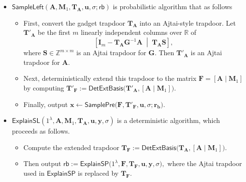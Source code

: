 \begin{itemize}[leftmargin=*]

    \item 
    $\mathsf{SampleLeft}(\mathbf{A},\mathbf{M}_1,\mathbf{T}_{\mathbf A},
    \mathbf{u},\sigma;\mathsf{rb})$ is probabilistic algorithm that  as follows

    \begin{itemize}
        \item First, convert the gadget trapdoor $\mathbf{T}_{\mathbf A}$ into an
        Ajtai-style trapdoor. Let $\mathbf{T}'_{\mathbf A}$ be the first $m$
        linearly independent columns over $\mathbb{R}$ of
        \[
            \left[
                \mathbf{I}_m
                -
                \mathbf{T}_{\mathbf A}\mathbf{G}^{-1}\mathbf{A}
                \;\middle|\;
                \mathbf{T}_{\mathbf A}\mathbf{S}
            \right],
        \]
        where $\mathbf{S}\in\mathbb{Z}^{m\times m}$ is an Ajtai trapdoor for
        $\mathbf{G}$. Then $\mathbf{T}'_{\mathbf A}$ is an Ajtai trapdoor for
        $\mathbf{A}$.

        \item Next, deterministically extend this trapdoor to the matrix
        $\mathbf{F}=[\mathbf{A}\mid\mathbf{M}_1]$ by computing
        $
            \mathbf{T}'_{\mathbf F}
            :=
            \mathsf{DetExtBasis}
            \bigl(
                \mathbf{T}'_{\mathbf A},
                [\mathbf{A}\mid\mathbf{M}_1]
            \bigr).
        $

        \item Finally, output
        $
            \mathbf{x}
            \leftarrow
            \mathsf{SamplePre}
            \bigl(
                \mathbf{F},
                \mathbf{T}'_{\mathbf F},
                \mathbf{u},
                \sigma;
                \mathbf{r_b}
            \bigr).
        $
    \end{itemize}

    \item
    $\mathsf{ExplainSL}(1^\lambda,\mathbf{A},\mathbf{M}_1,
    \mathbf{T}_{\mathbf A},\mathbf{u},\mathbf{y},\sigma)$ is a deterministic algorithm, which proceeds as follows.

    \begin{itemize}
        \item Compute the extended trapdoor
        $
            \mathbf{T}_{\mathbf F}
            :=
            \mathsf{DetExtBasis}
            \bigl(
                \mathbf{T}_{\mathbf A},
                [\mathbf{A}\mid\mathbf{M}_1]
            \bigr).
        $

        \item Then output
        $\mathsf{rb} :=
            \mathsf{ExplainSP}
            \bigl(
                1^\lambda,
                \mathbf{F},
                \mathbf{T}_{\mathbf F},
                \mathbf{u},
                \mathbf{y},
                \sigma
            \bigr),
        $
        where the Ajtai trapdoor used in $\mathsf{ExplainSP}$ is replaced by
        $\mathbf{T}_{\mathbf F}$.
    \end{itemize}

\end{itemize}

